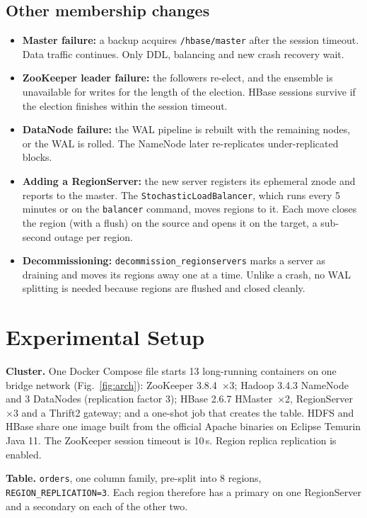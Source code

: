 \documentclass[10pt,twocolumn,letterpaper]{article}
\newcommand{\code}[1]{\texttt{\small #1}}
\begin{document}
\subsection{Other membership changes}
\begin{itemize}
\item \textbf{Master failure:} a backup acquires \code{/hbase/master} after the session timeout. Data traffic continues. Only DDL, balancing and new crash recovery wait.
\item \textbf{ZooKeeper leader failure:} the followers re-elect, and the ensemble is unavailable for writes for the length of the election. HBase sessions survive if the election finishes within the session timeout.
\item \textbf{DataNode failure:} the WAL pipeline is rebuilt with the remaining nodes, or the WAL is rolled. The NameNode later re-replicates under-replicated blocks.
\item \textbf{Adding a RegionServer:} the new server registers its ephemeral znode and reports to the master. The \code{StochasticLoadBalancer}, which runs every 5 minutes or on the \code{balancer} command, moves regions to it. Each move closes the region (with a flush) on the source and opens it on the target, a sub-second outage per region.
\item \textbf{Decommissioning:} \code{decommission\_regionservers} marks a server as draining and moves its regions away one at a time. Unlike a crash, no WAL splitting is needed because regions are flushed and closed cleanly.
\end{itemize}

\section{Experimental Setup}\label{sec:setup}
\textbf{Cluster.} One Docker Compose file starts 13 long-running containers on one bridge network (Fig.~\ref{fig:arch}): ZooKeeper 3.8.4~$\times$3; Hadoop 3.4.3 NameNode and 3 DataNodes (replication factor 3); HBase 2.6.7 HMaster~$\times$2, RegionServer~$\times$3 and a Thrift2 gateway; and a one-shot job that creates the table. HDFS and HBase share one image built from the official Apache binaries on Eclipse Temurin Java 11. The ZooKeeper session timeout is 10\,s. Region replica replication is enabled.

\textbf{Table.} \code{orders}, one column family, pre-split into 8 regions, \code{REGION\_REPLICATION=3}. Each region therefore has a primary on one RegionServer and a secondary on each of the other two.
\end{document}
